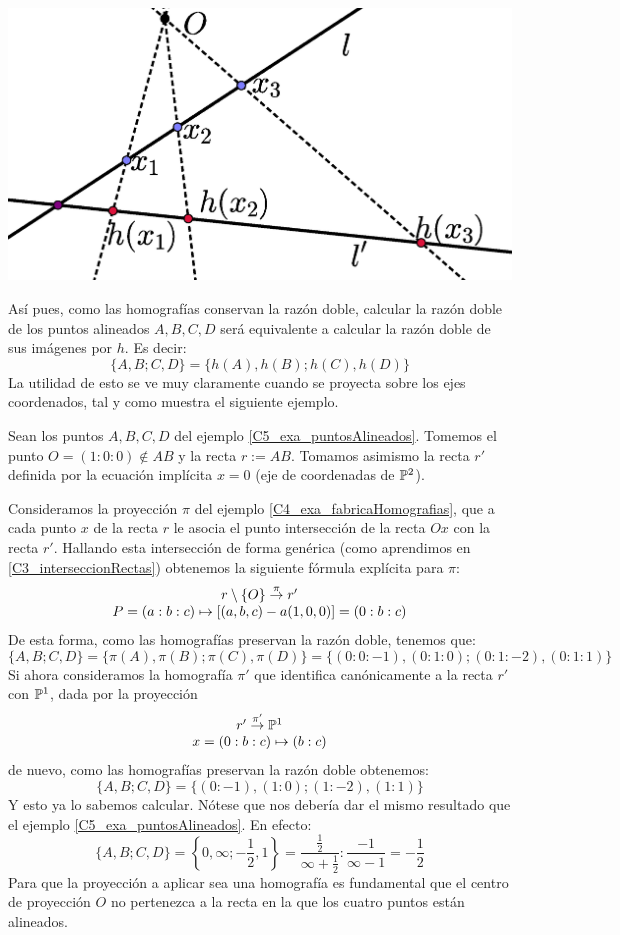 \begin{center}
	\includegraphics[scale=.3]{Graficos/perspectividad.eps}
\end{center}

Así pues, como las homografías conservan la razón doble, calcular la razón doble de los puntos alineados $A,B,C,D$ será equivalente a calcular la razón doble de sus imágenes por $h$. Es decir:
\[\{A,B;C,D\}=\{h(A),h(B);h(C),h(D)\}\]
La utilidad de esto se ve muy claramente cuando se proyecta sobre los ejes coordenados, tal y como muestra el siguiente ejemplo.
\begin{exa}\label{C5:ej_proy_sobre_ejes}
	Sean los puntos $A,B,C,D$ del ejemplo \ref{C5_exa_puntosAlineados}. Tomemos el punto $O=(1:0:0)\not\in AB$ y la recta $r:=AB$. Tomamos asimismo la recta $r'$ definida por la ecuación implícita $x=0$ (eje de coordenadas de $\mathbb{P}^2$).
	
	Consideramos la proyección $\pi$ del ejemplo \ref{C4_exa_fabricaHomografias}, que a cada punto $x$ de la recta $r$ le asocia el punto intersección de la recta $Ox$ con la recta $r'$. Hallando esta intersección de forma genérica (como aprendimos en \ref{C3_interseccionRectas}) obtenemos la siguiente fórmula explícita para $\pi$:
	\[\begin{array}{c}
	r\setminus\{O\}\stackrel{\pi}{\to} r'\\
	P=(a:b:c)\mapsto\left [ (a,b,c)-a(1,0,0) \right ]=(0:b:c)
	\end{array}\]
	De esta forma, como las homografías preservan la razón doble, tenemos que:
	\[\{A,B;C,D\}=\{\pi(A),\pi(B);\pi(C),\pi(D)\}=\{(0:0:-1),(0:1:0);(0:1:-2),(0:1:1)\}\]
	Si ahora consideramos la homografía $\pi'$ que identifica canónicamente a la recta $r'$ con $\mathbb{P}^1$, dada por la proyección
	\[\begin{array}{c}
	r'\stackrel{\pi'}{\to}\mathbb{P}^1\\
	x=(0:b:c)\mapsto(b:c)
	\end{array}\]
	de nuevo, como las homografías preservan la razón doble obtenemos:
	\[\{A,B;C,D\}=\{(0:-1),(1:0);(1:-2),(1:1)\}\]
	Y esto ya lo sabemos calcular. Nótese que nos debería dar el mismo resultado que el ejemplo \ref{C5_exa_puntosAlineados}. En efecto:
	\[\{A,B;C,D\}=\left\{0,\infty;-\frac{1}{2},1\right\}=\frac{\frac{1}{2}}{\infty+\frac{1}{2}}:\frac{-1}{\infty-1}=-\frac{1}{2}\]
	Para que la proyección a aplicar sea una homografía es fundamental que el centro de proyección $O$ no pertenezca a la recta en la que los cuatro puntos están alineados.
\end{exa}

